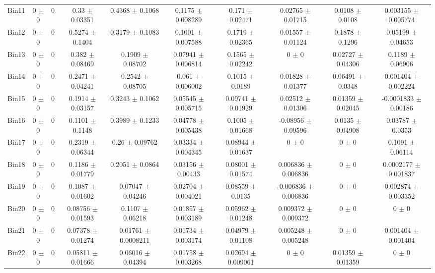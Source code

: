 \begin{tabular}{@{\extracolsep{4pt}}lccccccccc@{}}
     Bin11 & 0 $\pm$ 0 & 0 & 0.33 $\pm$ 0.03351 & 0.4368 $\pm$ 0.1068 & 0.1175 $\pm$ 0.008289 & 0.171 $\pm$ 0.02471 & 0.02765 $\pm$ 0.01715 & 0.0108 $\pm$ 0.0108 & 0.003155 $\pm$ 0.005774 \\ 
     Bin12 & 0 $\pm$ 0 & 0 & 0.5274 $\pm$ 0.1404 & 0.3179 $\pm$ 0.1083 & 0.1001 $\pm$ 0.007588 & 0.1719 $\pm$ 0.02365 & 0.01557 $\pm$ 0.01124 & 0.1878 $\pm$ 0.1296 & 0.05199 $\pm$ 0.04653 \\ 
     Bin13 & 0 $\pm$ 0 & 0 & 0.382 $\pm$ 0.08469 & 0.1909 $\pm$ 0.08702 & 0.07941 $\pm$ 0.006814 & 0.1565 $\pm$ 0.02242 & 0 $\pm$ 0 & 0.02727 $\pm$ 0.04306 & 0.1189 $\pm$ 0.06906 \\ 
     Bin14 & 0 $\pm$ 0 & 0 & 0.2471 $\pm$ 0.04241 & 0.2542 $\pm$ 0.08705 & 0.061 $\pm$ 0.006002 & 0.1015 $\pm$ 0.0189 & 0.01828 $\pm$ 0.01377 & 0.06491 $\pm$ 0.0348 & 0.001404 $\pm$ 0.002224 \\ 
     Bin15 & 0 $\pm$ 0 & 0 & 0.1914 $\pm$ 0.03157 & 0.3243 $\pm$ 0.1062 & 0.05545 $\pm$ 0.005715 & 0.09741 $\pm$ 0.01929 & 0.02512 $\pm$ 0.01306 & 0.01359 $\pm$ 0.02045 & -0.0001833 $\pm$ 0.00186 \\ 
     Bin16 & 0 $\pm$ 0 & 0 & 0.1101 $\pm$ 0.1148 & 0.3989 $\pm$ 0.1233 & 0.04778 $\pm$ 0.005438 & 0.1005 $\pm$ 0.01668 & -0.08956 $\pm$ 0.09596 & 0.0135 $\pm$ 0.04908 & 0.03787 $\pm$ 0.0353 \\ 
     Bin17 & 0 $\pm$ 0 & 0 & 0.2319 $\pm$ 0.06344 & 0.26 $\pm$ 0.09762 & 0.03334 $\pm$ 0.004345 & 0.08944 $\pm$ 0.01637 & 0 $\pm$ 0 & 0 $\pm$ 0 & 0.1091 $\pm$ 0.06114 \\ 
     Bin18 & 0 $\pm$ 0 & 0 & 0.1186 $\pm$ 0.01779 & 0.2051 $\pm$ 0.0864 & 0.03156 $\pm$ 0.00433 & 0.08001 $\pm$ 0.01574 & 0.006836 $\pm$ 0.006836 & 0 $\pm$ 0 & 0.0002177 $\pm$ 0.001837 \\ 
     Bin19 & 0 $\pm$ 0 & 0 & 0.1087 $\pm$ 0.01602 & 0.07047 $\pm$ 0.04246 & 0.02704 $\pm$ 0.004021 & 0.08559 $\pm$ 0.0135 & -0.006836 $\pm$ 0.006836 & 0 $\pm$ 0 & 0.002874 $\pm$ 0.003352 \\ 
     Bin20 & 0 $\pm$ 0 & 0 & 0.08756 $\pm$ 0.01593 & 0.1107 $\pm$ 0.06218 & 0.01857 $\pm$ 0.003189 & 0.05962 $\pm$ 0.01248 & 0.009372 $\pm$ 0.009372 & 0 $\pm$ 0 & 0 $\pm$ 0 \\ 
     Bin21 & 0 $\pm$ 0 & 0 & 0.07378 $\pm$ 0.01274 & 0.01761 $\pm$ 0.0008211 & 0.01734 $\pm$ 0.003174 & 0.04979 $\pm$ 0.01108 & 0.005248 $\pm$ 0.005248 & 0 $\pm$ 0 & 0.001404 $\pm$ 0.001404 \\ 
     Bin22 & 0 $\pm$ 0 & 0 & 0.05811 $\pm$ 0.01666 & 0.06016 $\pm$ 0.04394 & 0.01758 $\pm$ 0.003268 & 0.02694 $\pm$ 0.009061 & 0 $\pm$ 0 & 0.01359 $\pm$ 0.01359 & 0 $\pm$ 0 \\ 

\end{tabular}
